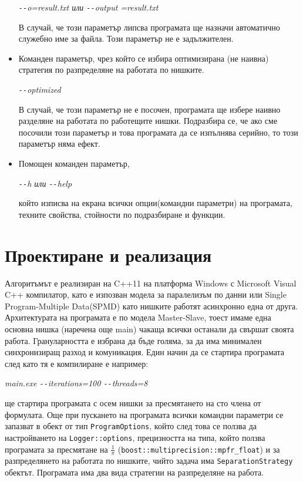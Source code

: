 \documentclass[a4paper,english]{article}
\begin{document}
\begin{itemize}
    \begin{center}
        \textit{\texttt{-{}-}o=result.txt или \texttt{-{}-}output =result.txt}
    \end{center}
    
    В случай, че този параметър липсва програмата ще назначи автоматично служебно име за файла. Този параметър не е задължителен.
    
    \item Команден параметър, чрез който се избира оптимизирана (не наивна) стратегия по разпределяне на работата по нишките.
    
    \begin{center}
        \textit{\texttt{-{}-}optimized}
    \end{center}
    
    В случай, че този параметър не е посочен, програмата ще избере наивно разделяне на работата по работещите нишки. Подразбира се, че ако сме посочили този параметър и това програмата да се изпълнява серийно, то този параметър няма ефект.
    
    \item Помощен команден параметър,
    
    \begin{center}
        \textit{\texttt{-{}-}h или \texttt{-{}-}help}
    \end{center}
    
    който изписва на екрана всички опции(командни параметри) на програмата, техните свойства, стойности по подразбиране и функции.
\end{itemize}


\section{Проектиране и реализация}
    Алгоритъмът е реализиран на C++11 на платформа Windows с Microsoft Visual C++ компилатор, като е изпозван модела за паралелизъм по данни или Single Program-Multiple Data(SPMD) като нишките работят асинхронно една от друга.\hfill
    Архитектурата на програмата е по модела Master-Slave, тоест имаме една основна нишка (наречена още main) чакаща всички останали да свършат своята работа.\hfill
    Грануларността е избрана да бъде голяма, за да има минимален синхронизиращ разход и комуникация.
    Един начин да се стартира програмата след като тя е компилиране е например:
    \begin{center}
        \textit{main.exe \texttt{-{}-}iterations=100 \texttt{-{}-}threads=8}
    \end{center}
    ще стартира програмата с осем нишки за пресмятането на сто члена от формулата.\hfill
    Още при пускането на програмата всички командни параметри се запазват в обект от тип \lstinline{ProgramOptions}, който след това се ползва да настройването на \lstinline{Logger::options}, прецизността на типа, който ползва програмата за пресмятане на \(\frac{1}{\pi}\) (\lstinline{boost::multiprecision::mpfr_float}) и за разпределянето на работата по нишките, чийто задача има \lstinline{SeparationStrategy} обектът.\hfill
    Програмата има два вида стратегии на разпределяне на работа.
    
\end{document}
